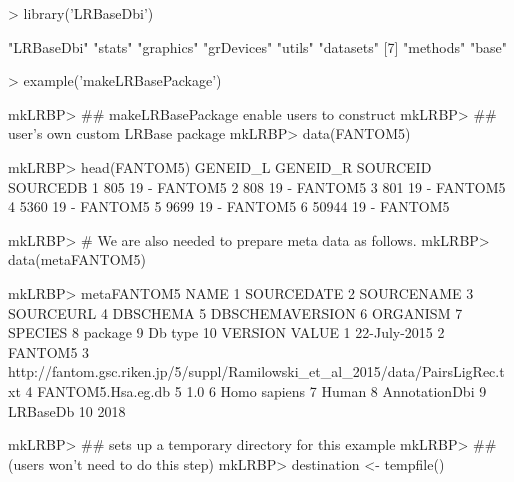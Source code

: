 \documentclass[11pt,a4paper,english,arial,twoside]{article}
\begin{document}
\begin{center}
\begin{Schunk}
\begin{Sinput}
> library('LRBaseDbi')
\end{Sinput}
\begin{Soutput}
[1] "LRBaseDbi" "stats"     "graphics"  "grDevices" "utils"     "datasets" 
[7] "methods"   "base"     
\end{Soutput}
\begin{Sinput}
> example('makeLRBasePackage')
\end{Sinput}
\begin{Soutput}
mkLRBP> ## makeLRBasePackage enable users to construct
mkLRBP> ## user's own custom LRBase package
mkLRBP> data(FANTOM5)

mkLRBP> head(FANTOM5)
  GENEID_L GENEID_R SOURCEID SOURCEDB
1      805       19        -  FANTOM5
2      808       19        -  FANTOM5
3      801       19        -  FANTOM5
4     5360       19        -  FANTOM5
5     9699       19        -  FANTOM5
6    50944       19        -  FANTOM5

mkLRBP> # We are also needed to prepare meta data as follows.
mkLRBP> data(metaFANTOM5)

mkLRBP> metaFANTOM5
              NAME
1       SOURCEDATE
2       SOURCENAME
3        SOURCEURL
4         DBSCHEMA
5  DBSCHEMAVERSION
6         ORGANISM
7          SPECIES
8          package
9          Db type
10         VERSION
                                                                           VALUE
1                                                                   22-July-2015
2                                                                        FANTOM5
3  http://fantom.gsc.riken.jp/5/suppl/Ramilowski_et_al_2015/data/PairsLigRec.txt
4                                                              FANTOM5.Hsa.eg.db
5                                                                            1.0
6                                                                   Homo sapiens
7                                                                          Human
8                                                                  AnnotationDbi
9                                                                       LRBaseDb
10                                                                          2018

mkLRBP> ## sets up a temporary directory for this example
mkLRBP> ## (users won't need to do this step)
mkLRBP> destination <- tempfile()


\end{Soutput}
\end{Schunk}
\end{center}
\end{document}
